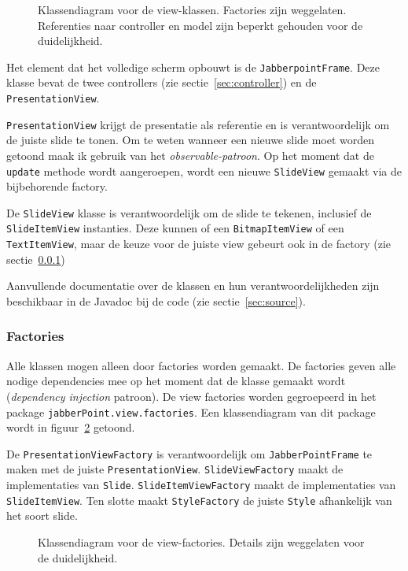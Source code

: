 \documentclass[a4paper]{article}
\newcommand{\code}[1]{\lstinline[columns=fixed]{#1}}
\newcommand{\diagram}[3][1.3]{
	\begin{figure}[!htb]
	 \caption{#3}
	 \label{diagram:#2}
	 \makebox[\textwidth][c]{\texttt{[image: Diagrams/\#2.pdf]}}%
	\end{figure}
}
\begin{document}
		\diagram{view}{
			Klassendiagram voor de view-klassen.
			Factories zijn weggelaten.
			Referenties naar controller en model zijn beperkt gehouden voor de duidelijkheid.
		}

		Het element dat het volledige scherm opbouwt is de \code{JabberpointFrame}.
		Deze klasse bevat de twee controllers (zie sectie~\ref{sec:controller}) en de \code{PresentationView}.

		\code{PresentationView} krijgt de presentatie als referentie en is verantwoordelijk om de juiste slide te tonen.
		Om te weten wanneer een nieuwe slide moet worden getoond maak ik gebruik van het \textit{observable-patroon}.
		Op het moment dat de \code{update} methode wordt aangeroepen, wordt een nieuwe \code{SlideView} gemaakt via de bijbehorende factory.

		De \code{SlideView} klasse is verantwoordelijk om de slide te tekenen, inclusief de \code{SlideItemView} instanties.
		Deze kunnen of een \code{BitmapItemView} of een \code{TextItemView}, maar de keuze voor de juiste view gebeurt ook in de factory (zie sectie~\ref{sec:view-factories})

		Aanvullende documentatie over de klassen en hun verantwoordelijkheden zijn beschikbaar in de Javadoc bij de code (zie sectie~\ref{sec:source}).

		\subsubsection{Factories}\label{sec:view-factories}
			Alle klassen mogen alleen door factories worden gemaakt.
			De factories geven alle nodige dependencies mee op het moment dat de klasse gemaakt wordt (\textit{dependency injection} patroon).
			De view factories worden gegroepeerd in het package \code{jabberPoint.view.factories}.
			Een klassendiagram van dit package wordt in figuur~\ref{diagram:view-factories} getoond.

			De \code{PresentationViewFactory} is verantwoordelijk om \code{JabberPointFrame} te maken met de juiste \code{PresentationView}.
			\code{SlideViewFactory} maakt de implementaties van \code{Slide}.
			\code{SlideItemViewFactory} maakt de implementaties van \code{SlideItemView}.
			Ten slotte maakt \code{StyleFactory} de juiste \code{Style} afhankelijk van het soort slide.

			\diagram{view-factories}{
				Klassendiagram voor de view-factories.\label{diagram:view-factories}
				Details zijn weggelaten voor de duide\-lijk\-heid.
			}
\end{document}
